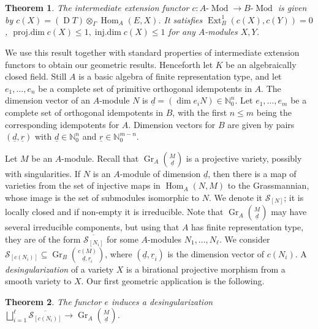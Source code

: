 \documentclass[11pt,a4paper]{amsart}
\theoremstyle{plain}
\newtheorem{thm}{Theorem}[section]
\theoremstyle{definition}
\begin{document}
\begin{thm}
The intermediate extension functor $c:\text{$A$-$\operatorname{Mod}$} \to \text{$B$-$\operatorname{Mod}$}$
is given by $c(X) = (\operatorname{D} T)\otimes_\Gamma \operatorname{Hom}_A(E,X)$.
It satisfies $\operatorname{Ext}^1_B(c(X),c(Y)) = 0$, $\operatorname{proj.dim} c(X)\leq 1, \operatorname{inj.dim} c(X)\leq 1$ for any $A$-modules $X,Y$.
\end{thm}

We use this result together with standard properties of intermediate extension functors to obtain our geometric results.
Henceforth let $K$ be an algebraically closed field. 
Still $A$ is a basic algebra of finite representation type, and
let $e_1,\dots,e_n$ be a
complete set of primitive orthogonal idempotents in $A$.
The dimension vector of an $A$-module $N$ is ${\underline{d}} = (\dim e_i N) \in {\mathbb{N}}_0^n$.
Let $e_1,\dots,e_m$ be a complete set of orthogonal idempotents in $B$, with the first 
$n\le m$ being the corresponding idempotents for $A$. Dimension vectors for $B$ are given by pairs
$({\underline{d}},{\underline{r}})$ with ${\underline{d}}\in{\mathbb{N}}_0^n$ and ${\underline{r}}\in{\mathbb{N}}_0^{m-n}$.

Let $M$ be an $A$-module.
Recall that ${\operatorname{Gr}_A \binom{M}{\underline{d}}}$ is a projective variety,
possibly with singularities.  
If $N$ is an $A$-module of dimension ${\underline{d}}$, then there is a map of varieties
from the set of injective maps in $\operatorname{Hom}_A(N,M)$ to the Grassmannian, whose
image is the set of submodules isomorphic to $N$. We denote it ${\mathcal{S}}_{[N]}$;
it is locally closed and if non-empty it is irreducible.
Note that ${\operatorname{Gr}_A \binom{M}{\underline{d}}}$ may have several irreducible components, 
but using that $A$ has finite representation type, they are of the form
$\overline{{\mathcal{S}}_{[N_i]}}$ for some $A$-modules $N_1,\dots,N_\ell$.
We consider ${\mathcal{S}}_{[c(N_i)]} \subseteq {\operatorname{Gr}_B \binom{{c} (M)}{\underline{d}, \underline{r}_i}}$, where $({\underline{d}},{\underline{r}}_i)$ is
the dimension vector of $c(N_i)$.
A \emph{desingularization} of a variety $X$ is a birational projective morphism 
from a smooth variety to $X$.
Our first geometric application is the following.

\begin{thm} \label{GrassDes} 
The functor $e$ induces a desingularization
$
\bigsqcup_{i=1}^\ell
\overline{{\mathcal{S}}_{[c(N_i)]}}
\to {\operatorname{Gr}_A \binom{M}{\underline{d}}}
$.
\end{thm}
\end{document}
